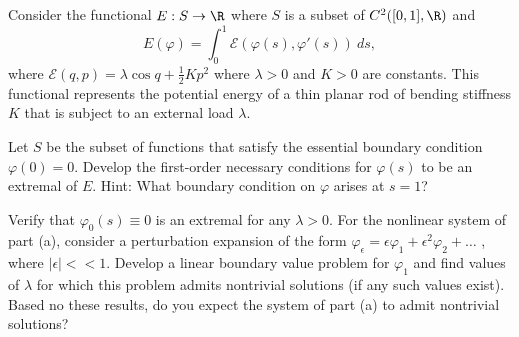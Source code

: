 Consider the functional $E:S\rightarrow \R$ where $S$ is a subset of
$C^2([0,1],\R)$ and
$$E(\varphi)=\int_{0}^1\mathcal{E}(\varphi(s),\varphi'(s))\ ds,$$
where $\mathcal{E}(q,p)=\lambda\cos q + \frac{1}{2}K p^2$ where
$\lambda>0$ and $K>0$ are constants. This functional represents the
potential energy of a thin planar rod of bending stiffness $K$ that is
subject to an external load $\lambda$.
\begin{alist}
\item Let $S$ be the subset of functions that satisfy the essential
boundary condition $\varphi(0)=0$. Develop the first-order necessary
conditions for $\varphi(s)$ to be an extremal of $E$. Hint: What
boundary condition on $\varphi$ arises at $s=1$?
\item Verify that $\varphi_0(s)\equiv 0$ is an extremal for any
$\lambda>0$. For the nonlinear system of part (a), consider a
perturbation expansion of the form
$\varphi_{\epsilon}=\epsilon\varphi_1+\epsilon^2\varphi_2+\ldots $ ,
where $|\epsilon|<<1$. Develop a linear boundary value problem for
$\varphi_1$ and find values of $\lambda$ for which this problem admits
nontrivial solutions (if any such values exist). Based no these
results, do you expect the system of part (a) to admit nontrivial
solutions?
\end{alist}
